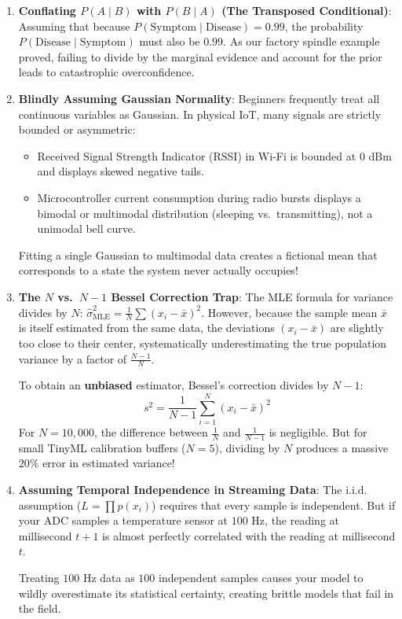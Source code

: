 \begin{warning}
\begin{enumerate}
    \item \textbf{Conflating $P(A \mid B)$ with $P(B \mid A)$ (The Transposed Conditional)}:
    Assuming that because $P(\text{Symptom} \mid \text{Disease}) = 0.99$, the probability $P(\text{Disease} \mid \text{Symptom})$ must also be $0.99$. As our factory spindle example proved, failing to divide by the marginal evidence and account for the prior leads to catastrophic overconfidence.
    
    \item \textbf{Blindly Assuming Gaussian Normality}:
    Beginners frequently treat all continuous variables as Gaussian. In physical IoT, many signals are strictly bounded or asymmetric:
    \begin{itemize}
        \item Received Signal Strength Indicator (RSSI) in Wi-Fi is bounded at $0\text{ dBm}$ and displays skewed negative tails.
        \item Microcontroller current consumption during radio bursts displays a bimodal or multimodal distribution (sleeping vs.\ transmitting), not a unimodal bell curve.
    \end{itemize}
    Fitting a single Gaussian to multimodal data creates a fictional mean that corresponds to a state the system never actually occupies!

    \item \textbf{The $N$ vs.\ $N - 1$ Bessel Correction Trap}:
    The MLE formula for variance divides by $N$: $\hat{\sigma}^2_{\text{MLE}} = \frac{1}{N}\sum (x_i - \bar{x})^2$. However, because the sample mean $\bar{x}$ is itself estimated from the same data, the deviations $(x_i - \bar{x})$ are slightly too close to their center, systematically underestimating the true population variance by a factor of $\frac{N-1}{N}$.
    
    To obtain an \textbf{unbiased} estimator, Bessel's correction divides by $N - 1$:
    \begin{equation}
    s^2 = \frac{1}{N - 1}\sum_{i=1}^{N} (x_i - \bar{x})^2
    \end{equation}
    For $N = 10,000$, the difference between $\frac{1}{N}$ and $\frac{1}{N-1}$ is negligible. But for small TinyML calibration buffers ($N = 5$), dividing by $N$ produces a massive $20\%$ error in estimated variance!

    \item \textbf{Assuming Temporal Independence in Streaming Data}:
    The i.i.d. assumption ($L = \prod p(x_i)$) requires that every sample is independent. But if your ADC samples a temperature sensor at $100\text{ Hz}$, the reading at millisecond $t+1$ is almost perfectly correlated with the reading at millisecond $t$. 

    Treating $100\text{ Hz}$ data as $100$ independent samples causes your model to wildly overestimate its statistical certainty, creating brittle models that fail in the field.
\end{enumerate}
\end{warning}

